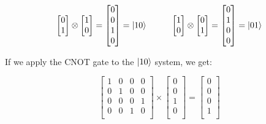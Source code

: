 \documentclass{article}
\begin{document}
\begin{center}
	\[
		\begin{bmatrix}
			0 \\
			1 \\
		\end{bmatrix}
		\otimes
		\begin{bmatrix}
			1 \\
			0 \\
		\end{bmatrix}
		=
		\begin{bmatrix}
			0 \\
			0 \\
			1 \\
			0 \\
		\end{bmatrix}
		=
		\ket{10}
		\hspace{1cm}
		\begin{bmatrix}
			1 \\
			0 \\
		\end{bmatrix}
		\otimes
		\begin{bmatrix}
			0 \\
			1 \\
		\end{bmatrix}
		=
		\begin{bmatrix}
			0 \\
			1 \\
			0 \\
			0 \\
		\end{bmatrix}
		=
		\ket{01}
	\]
\end{center}

If we apply the CNOT gate to the $\ket{10}$ system, we get:

\begin{center}
	\[
		\begin{bmatrix}
			1 & 0 & 0 & 0 \\
			0 & 1 & 0 & 0 \\
			0 & 0 & 0 & 1 \\
			0 & 0 & 1 & 0 \\
		\end{bmatrix}
		\times
		\begin{bmatrix}
			0 \\
			0 \\
			1 \\
			0 \\
		\end{bmatrix}
		=
		\begin{bmatrix}
			0 \\
			0 \\
			0 \\
			1 \\
		\end{bmatrix}
	\]
\end{center}
\end{document}
